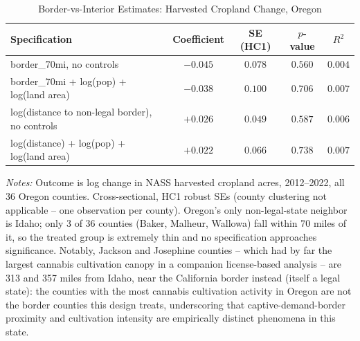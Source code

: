 \begin{table}[htbp]
\centering
\caption{Border-vs-Interior Estimates: Harvested Cropland Change, Oregon}
\label{tab:cropsub_border70}
\begin{tabular}{lcccc}
\toprule
Specification & Coefficient & SE (HC1) & $p$-value & $R^2$ \\
\midrule
border\_70mi, no controls & $-0.045$ & $0.078$ & $0.560$ & $0.004$ \\
border\_70mi + log(pop) + log(land area) & $-0.038$ & $0.100$ & $0.706$ & $0.007$ \\
log(distance to non-legal border), no controls & $+0.026$ & $0.049$ & $0.587$ & $0.006$ \\
log(distance) + log(pop) + log(land area) & $+0.022$ & $0.066$ & $0.738$ & $0.007$ \\
\bottomrule
\end{tabular}
\begin{minipage}{0.95\textwidth}
\vspace{0.3em}
\footnotesize
\textit{Notes:} Outcome is log change in NASS harvested cropland acres, 2012--2022, all 36 Oregon
counties. Cross-sectional, HC1 robust SEs (county clustering not applicable -- one observation per
county). Oregon's only non-legal-state neighbor is Idaho; only 3 of 36 counties (Baker, Malheur, Wallowa)
fall within 70 miles of it, so the treated group is extremely thin and no specification approaches
significance. Notably, Jackson and Josephine counties -- which had by far the largest cannabis
cultivation canopy in a companion license-based analysis -- are 313 and 357 miles from Idaho, near the
California border instead (itself a legal state): the counties with the most cannabis cultivation activity
in Oregon are not the border counties this design treats, underscoring that captive-demand-border
proximity and cultivation intensity are empirically distinct phenomena in this state.
\end{minipage}
\end{table}
